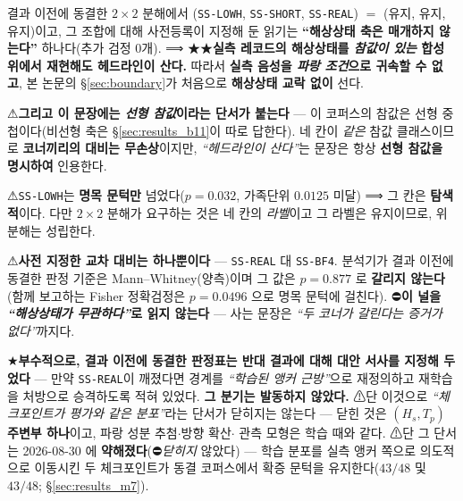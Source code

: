 \documentclass[11pt]{report}
\numberwithin{equation}{chapter}
\numberwithin{figure}{chapter}
\numberwithin{table}{chapter}
\begin{document}
결과 이전에 동결한 $2\times2$ 분해에서 (\texttt{SS-LOWH}, \texttt{SS-SHORT},
\texttt{SS-REAL}) $=$ (유지, 유지, 유지)이고, 그 조합에 대해 사전등록이 지정해 둔 읽기는
\textbf{``해상상태 축은 매개하지 않는다''} 하나다(추가 검정 $0$개).
⟹ ★★\textbf{실측 레코드의 해상상태를 \emph{참값이 있는} 합성 위에서 재현해도 헤드라인이
산다.} 따라서 \textbf{실측 음성을 \emph{파랑 조건}으로 귀속할 수 없고}, 본 논문의
\S\ref{sec:boundary}가 처음으로 \textbf{해상상태 교락 없이} 선다.

⚠\textbf{그리고 이 문장에는 \emph{선형 참값}이라는 단서가 붙는다} --- 이 코퍼스의 참값은
선형 중첩이다(비선형 축은 \S\ref{sec:results_b11}이 따로 답한다). 네 칸이 \emph{같은}
참값 클래스이므로 \textbf{코너끼리의 대비는 무손상}이지만, \emph{``헤드라인이 산다''}는
문장은 항상 \textbf{선형 참값을 명시하여} 인용한다.

⚠\texttt{SS-LOWH}는 \textbf{명목 문턱만} 넘었다($p = 0.032$, 가족단위 $0.0125$ 미달)
⟹ 그 칸은 \textbf{탐색적}이다. 다만 $2\times2$ 분해가 요구하는 것은 네 칸의 \emph{라벨}이고
그 라벨은 유지이므로, 위 분해는 성립한다.

⚠\textbf{사전 지정한 교차 대비는 하나뿐이다} --- \texttt{SS-REAL} 대 \texttt{SS-BF4}.
분석기가 결과 이전에 동결한 판정 기준은 Mann--Whitney(양측)이며 그 값은
$p = 0.877$ 로 \textbf{갈리지 않는다}(함께 보고하는 Fisher 정확검정은
$p = 0.0496$ 으로 명목 문턱에 걸친다). ⛔\textbf{이 널을 \emph{``해상상태가 무관하다''}로
읽지 않는다} --- 사는 문장은 \emph{``두 코너가 갈린다는 증거가 없다''}까지다.

★\textbf{부수적으로, 결과 이전에 동결한 판정표는 반대 결과에 대해 대안 서사를 지정해
두었다} --- 만약 \texttt{SS-REAL}이 깨졌다면 경계를 \emph{``학습된 앵커 근방''}으로
재정의하고 재학습을 처방으로 승격하도록 적혀 있었다. \textbf{그 분기는 발동하지 않았다.}
⚠단 이것으로 \emph{``체크포인트가 평가와 같은 분포''}라는 단서가 닫히지는 않는다 ---
닫힌 것은 $(H_s, T_p)$ \textbf{주변부 하나}이고, 파랑 성분 추첨$\cdot$방향 확산$\cdot$
관측 모형은 학습 때와 같다.
⚠단 그 단서는 2026-08-30 에 \textbf{약해졌다}(⛔\emph{닫히지} 않았다) --- 학습 분포를
실측 앵커 쪽으로 의도적으로 이동시킨 두 체크포인트가 동결 코퍼스에서 확증 문턱을
유지한다($43/48$ 및 $43/48$; \S\ref{sec:results_m7}).
\end{document}
